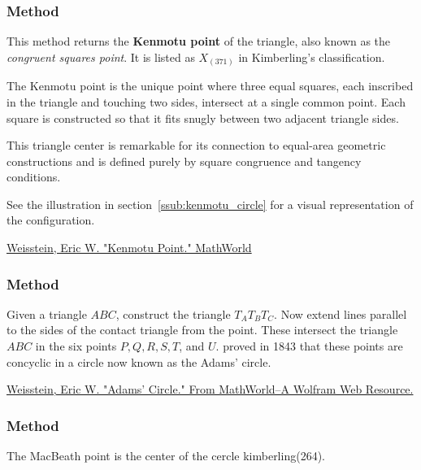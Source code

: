 \subsubsection{Method }
\label{ssub:_triangle_kenmotu__point}

This method returns the \textbf{Kenmotu point} of the triangle, also known as the \emph{congruent squares point}. It is listed as $X_{(371)}$ in Kimberling’s classification.

\medskip
\noindent
The Kenmotu point is the unique point where three equal squares, each inscribed in the triangle and touching two sides, intersect at a single common point. Each square is constructed so that it fits snugly between two adjacent triangle sides.

\medskip
\noindent
This triangle center is remarkable for its connection to equal-area geometric constructions and is defined purely by square congruence and tangency conditions.

\medskip
\noindent
See  the illustration in section~\ref{ssub:kenmotu_circle} for a visual representation of the configuration.
\begin{flushright}
\small
\href{https://mathworld.wolfram.com/KenmotuPoint.html}{Weisstein, Eric W. "Kenmotu Point." MathWorld}
\end{flushright}

\subsubsection{Method }
\label{ssub:method_triangle_adams_points}
Given a triangle $ABC$, construct the  triangle $T_AT_BT_C$. Now extend lines parallel to the sides of the contact triangle from the  point. These intersect the triangle $ABC$ in the six points $P, Q,  R, S, T$, and $U$.  proved in 1843 that these points are concyclic in a circle now known as the Adams' circle.
\begin{flushright}
\small
\href{ https://mathworld.wolfram.com/AdamsCircle.html}{Weisstein, Eric W. "Adams' Circle." From MathWorld--A Wolfram Web Resource.}
\end{flushright}

\subsubsection{Method }
\label{ssub:method_triangle_macbeath_point}
The MacBeath point is the center of the cercle kimberling(264).

